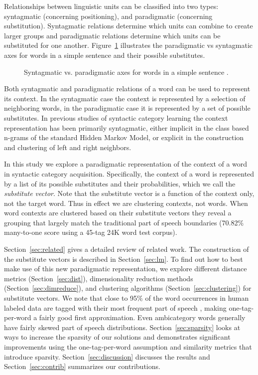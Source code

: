 \documentclass[11pt]{article}
\newcommand{\collapseResult}{70.82}
\begin{document}
Relationships between linguistic units can be classified into two
types: syntagmatic (concerning positioning), and paradigmatic
(concerning substitution).  Syntagmatic relations determine which
units can combine to create larger groups and paradigmatic relations
determine which units can be substituted for one another.
Figure~\ref{fig:paradigmatic} illustrates the paradigmatic vs
syntagmatic axes for words in a simple sentence and their possible
substitutes.

\begin{figure}[h] \centering

\caption{Syntagmatic vs. paradigmatic axes for words in a simple
  sentence \cite{chandler2007semiotics}.}
\label{fig:paradigmatic}
\end{figure}

Both syntagmatic and paradigmatic relations of a word can be used to
represent its context.  In the syntagmatic case the context is
represented by a selection of neighboring words, in the paradigmatic
case it is represented by a set of possible substitutes.  In previous
studies of syntactic category learning the context representation has
been primarily syntagmatic, either implicit in the class based n-grams
of the standard Hidden Markov Model, or explicit in the construction
and clustering of left and right neighbors.

In this study we explore a paradigmatic representation of the context
of a word in syntactic category acquisition.  Specifically, the
context of a word is represented by a list of its possible substitutes
and their probabilities, which we call the {\em substitute vector}.
Note that the substitute vector is a function of the context only, not
the target word.  Thus in effect we are clustering contexts, not
words.  When word contexts are clustered based on their substitute
vectors they reveal a grouping that largely match the traditional part
of speech boundaries (\collapseResult\% many-to-one score using a
45-tag 24K word test corpus).

Section~\ref{sec:related} gives a detailed review of related work.
The construction of the substitute vectors is described in
Section~\ref{sec:lm}.  To find out how to best make use of this new
paradigmatic representation, we explore different distance metrics
(Section~\ref{sec:dist}), dimensionality reduction methods
(Section~\ref{sec:dimreduce}), and clustering algorithms
(Section~\ref{sec:clustering}) for substitute vectors.  We note that
close to 95\% of the word occurrences in human labeled data are tagged
with their most frequent part of speech
\cite{Lee:2010:STU:1870658.1870741}, making one-tag-per-word a fairly
good first approximation.  Even ambicategory words generally have
fairly skewed part of speech distributions.
Section~\ref{sec:sparsity} looks at ways to increase the sparsity of
our solutions and demonstrates significant improvements using the
one-tag-per-word assumption and similarity metrics that introduce
sparsity.  Section~\ref{sec:discussion} discusses the results and
Section~\ref{sec:contrib} summarizes our contributions.
\end{document}
